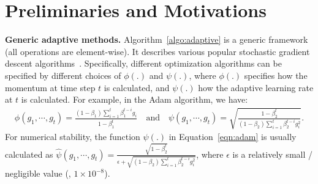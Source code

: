 
\section{Preliminaries and Motivations}

\noindent
\textbf{Generic adaptive methods.} Algorithm~\ref{algo:adaptive} is a generic framework (all operations are element-wise).
It describes various popular stochastic gradient descent algorithms~\citep{reddi2019convergence}.
Specifically, different optimization algorithms can be specified by different choices of $\phi(.)$ and $\psi(.)$, where
$\phi(.)$ specifies how the momentum at time step $t$ is calculated, and $\psi(.)$ how the adaptive learning rate at $t$ is calculated.
For example, 
in the Adam algorithm, we have:
\begin{align}
\phi(g_1, \cdots, g_t) = \frac{(1 - \beta_1)\sum_{i = 1}^t \beta_1^{t-i}g_i}{1 - \beta_1^t} 
\quad\mbox{and}\quad 
\psi(g_1, \cdots, g_t) = \sqrt{\frac{1-\beta_2^t}{(1 - \beta_2)\sum_{i = 1}^t \beta_2^{t-i}g_i^2}}.
\label{eqn:adam}
\end{align}
For numerical stability, the function $\psi(.)$ in Equation~\ref{eqn:adam} is usually calculated as $\hat{\psi}(g_1, \cdots, g_t) = \frac{\sqrt{1-\beta_2^t}}{\epsilon + \sqrt{(1 - \beta_2)\sum_{i = 1}^t \beta_2^{t-i}g_i^2}}$, 
where $\epsilon$ is a relatively small / negligible value (\eg, $1\times 10^{-8}$). 

\begin{algorithm}[!ht]
\DontPrintSemicolon
{}
\caption{Generic adaptive optimization method setup. All operations are element-wise. }
\label{algo:adaptive}
\end{algorithm}


